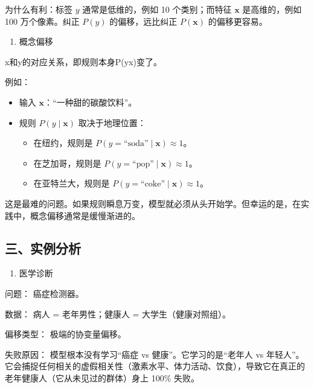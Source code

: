 为什么有利：标签 \(y\) 通常是低维的，例如 10 个类别；而特征 \(\mathbf{x}\) 是高维的，例如 100 万个像素。纠正 \(P(y)\) 的偏移，远比纠正 \(P(\mathbf{x})\) 的偏移更容易。

\begin{enumerate}
\def\labelenumi{\arabic{enumi}.}
\setcounter{enumi}{2}
\tightlist
\item
  概念偏移
\end{enumerate}

x和y的对应关系，即规则本身P(y\textbar x)变了。

例如：

\begin{itemize}
\tightlist
\item
  输入 \(\mathbf{x}\)：``一种甜的碳酸饮料''。
\item
{}
  规则 \(P(y\mid\mathbf{x})\) 取决于地理位置：

  \begin{itemize}
  \tightlist
  \item
    在纽约，规则是 \(P(y=\text{“soda”}\mid\mathbf{x})\approx 1\)。
  \item
    在芝加哥，规则是 \(P(y=\text{“pop”}\mid\mathbf{x})\approx 1\)。
  \item
    在亚特兰大，规则是 \(P(y=\text{“coke”}\mid\mathbf{x})\approx 1\)。
  \end{itemize}
\end{itemize}

这是最难的问题。如果规则瞬息万变，模型就必须从头开始学。但幸运的是，在实践中，概念偏移通常是缓慢渐进的。

\hypertarget{ux4e09ux5b9eux4f8bux5206ux6790}{%
\subsection{三、实例分析}\label{ux4e09ux5b9eux4f8bux5206ux6790}}

\begin{enumerate}
\def\labelenumi{\arabic{enumi}.}
\tightlist
\item
  医学诊断
\end{enumerate}

问题： 癌症检测器。

数据： 病人 = 老年男性；健康人 = 大学生（健康对照组）。

偏移类型： 极端的协变量偏移。

失败原因： 模型根本没有学习``癌症 vs 健康''。它学习的是``老年人 vs 年轻人''。它会捕捉任何相关的虚假相关性（激素水平、体力活动、饮食），导致它在真正的老年健康人（它从未见过的群体）身上 100\% 失败。

